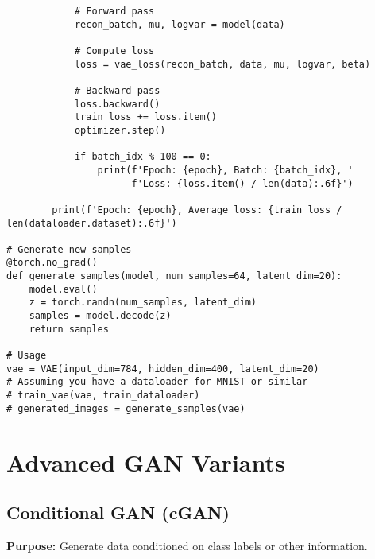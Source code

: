 \documentclass[11pt,a4paper]{book}
\begin{document}
\begin{verbatim}
            # Forward pass
            recon_batch, mu, logvar = model(data)
            
            # Compute loss
            loss = vae_loss(recon_batch, data, mu, logvar, beta)
            
            # Backward pass
            loss.backward()
            train_loss += loss.item()
            optimizer.step()
            
            if batch_idx % 100 == 0:
                print(f'Epoch: {epoch}, Batch: {batch_idx}, '
                      f'Loss: {loss.item() / len(data):.6f}')
        
        print(f'Epoch: {epoch}, Average loss: {train_loss / len(dataloader.dataset):.6f}')

# Generate new samples
@torch.no_grad()
def generate_samples(model, num_samples=64, latent_dim=20):
    model.eval()
    z = torch.randn(num_samples, latent_dim)
    samples = model.decode(z)
    return samples

# Usage
vae = VAE(input_dim=784, hidden_dim=400, latent_dim=20)
# Assuming you have a dataloader for MNIST or similar
# train_vae(vae, train_dataloader)
# generated_images = generate_samples(vae)
\end{verbatim}

\section{Advanced GAN Variants}

\subsection{Conditional GAN (cGAN)}

\textbf{Purpose:} Generate data conditioned on class labels or other information.
\end{document}
